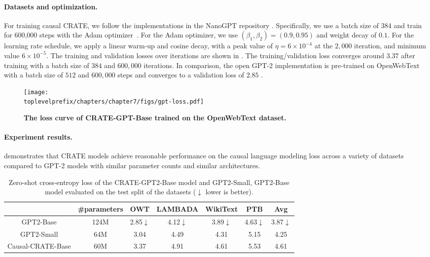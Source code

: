 \documentclass[\toplevelprefix/book-main.tex]{subfiles}
\begin{document}
\paragraph{Datasets and optimization.} For training causal CRATE, we follow the implementations in the NanoGPT repository \citep{nanogpt}. Specifically, we use a batch size of 384 and train for 600,000 steps with the Adam optimizer~\citep{kingma2014adam}. For the Adam optimizer, we use $(\beta_1, \beta_2)=(0.9, 0.95)$ and weight decay of $0.1$. For the learning rate schedule, we apply a linear warm-up and cosine decay, with a peak value of $\eta=6\times 10^{-4}$ at the $2,000$ iteration, and minimum value $6\times 10^{-5}$. The training and validation losses over iterations are shown in . The training/validation loss converges around $3.37$ after training with a batch size of $384$ and $600,000$ iterations. In comparison, the open GPT-2 implementation is pre-trained on OpenWebText with a batch size of $512$ and $600,000$ steps and converges to a validation loss of $2.85$ \citep{nanogpt}.  

\begin{figure}
    \centering
    \texttt{[image: \\toplevelprefix/chapters/chapter7/figs/gpt-loss.pdf]}
    \caption{\bf The loss curve of CRATE-GPT-Base trained on the OpenWebText dataset.}
    \label{fig:crate-text-evals}
\end{figure}

\paragraph{Experiment results.}

 demonstrates that CRATE models achieve reasonable performance on the causal language modeling loss across a variety of datasets compared to GPT-2 models with similar parameter counts and similar architectures.


\begin{table}
\def\arraystretch{1.1}
    \small
    \caption{\small Zero-shot cross-entropy loss of the CRATE-GPT2-Base model and GPT2-Small, GPT2-Base model evaluated on the test split of the datasets ($\downarrow$ lower is better). 
    }
    \centering
    \begin{tabular}{ccccccc}
    \hline
    & \#parameters & \textbf{OWT} & \textbf{LAMBADA} & \textbf{WikiText} & \textbf{PTB} & \textbf{Avg} \\
     \hline
     GPT2-Base  & {124M} & 2.85$\downarrow$ & 4.12$\downarrow$ & 3.89$\downarrow$ & 4.63$\downarrow$ & 3.87$\downarrow$ \\
     {GPT2-Small } &  {64M} & {3.04} & {4.49} & {4.31} & {5.15} & {4.25} \\
     Causal-CRATE-Base & {60M} & 3.37 & 4.91 & 4.61 & 5.53 & 4.61 \\
     \hline
    \end{tabular}
    \label{tab:gpt-eval}
\end{table} 
\end{document}
